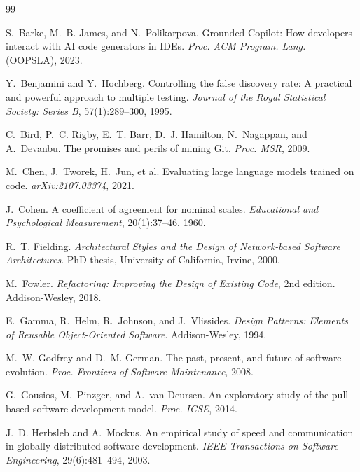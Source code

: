 \documentclass[sigconf,review]{acmart}
\begin{document}
\begin{thebibliography}{99}
\small

S.~Barke, M.~B. James, and N.~Polikarpova.
\newblock Grounded {Copilot}: How developers interact with {AI} code generators in {IDE}s.
\newblock \emph{Proc. ACM Program. Lang.} (OOPSLA), 2023.

Y.~Benjamini and Y.~Hochberg.
\newblock Controlling the false discovery rate: A practical and powerful approach to multiple testing.
\newblock \emph{Journal of the Royal Statistical Society: Series B}, 57(1):289--300, 1995.

C.~Bird, P.~C. Rigby, E.~T. Barr, D.~J. Hamilton, N.~Nagappan, and A.~Devanbu.
\newblock The promises and perils of mining {Git}.
\newblock \emph{Proc. MSR}, 2009.

M.~Chen, J.~Tworek, H.~Jun, et al.
\newblock Evaluating large language models trained on code.
\newblock \emph{arXiv:2107.03374}, 2021.

J.~Cohen.
\newblock A coefficient of agreement for nominal scales.
\newblock \emph{Educational and Psychological Measurement}, 20(1):37--46, 1960.

R.~T. Fielding.
\newblock \emph{Architectural Styles and the Design of Network-based Software Architectures}.
\newblock PhD thesis, University of California, Irvine, 2000.

M.~Fowler.
\newblock \emph{Refactoring: Improving the Design of Existing Code}, 2nd edition.
\newblock Addison-Wesley, 2018.

E.~Gamma, R.~Helm, R.~Johnson, and J.~Vlissides.
\newblock \emph{Design Patterns: Elements of Reusable Object-Oriented Software}.
\newblock Addison-Wesley, 1994.

M.~W. Godfrey and D.~M. German.
\newblock The past, present, and future of software evolution.
\newblock \emph{Proc. Frontiers of Software Maintenance}, 2008.

G.~Gousios, M.~Pinzger, and A.~van Deursen.
\newblock An exploratory study of the pull-based software development model.
\newblock \emph{Proc. ICSE}, 2014.

J.~D. Herbsleb and A.~Mockus.
\newblock An empirical study of speed and communication in globally distributed software development.
\newblock \emph{IEEE Transactions on Software Engineering}, 29(6):481--494, 2003.


\end{thebibliography}
\end{document}
